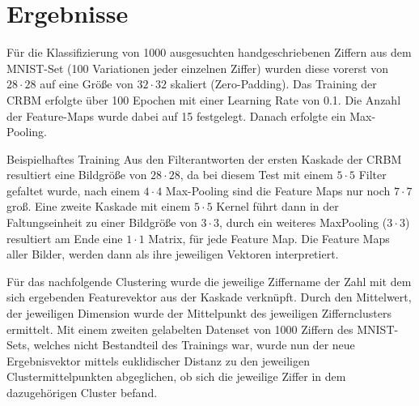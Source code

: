 \section{Ergebnisse}\label{results}

Für die Klassifizierung von 1000 ausgesuchten handgeschriebenen Ziffern aus dem MNIST-Set (100 Variationen jeder einzelnen Ziffer) wurden diese vorerst von $28 \cdot 28$ auf eine Größe von $32 \cdot 32$ skaliert (Zero-Padding). Das Training der CRBM erfolgte über 100 Epochen mit einer Learning Rate von 0.1. Die Anzahl der Feature-Maps wurde dabei auf 15 festgelegt.
Danach erfolgte ein Max-Pooling. 
\newline 

Beispielhaftes Training
Aus den Filterantworten der ersten Kaskade der CRBM resultiert eine Bildgröße von $28 \cdot 28$, da bei diesem Test mit einem $5 \cdot 5$ Filter gefaltet wurde, nach einem $4 \cdot 4$ Max-Pooling sind die Feature Maps nur noch $7 \cdot 7$ groß. Eine zweite Kaskade mit einem  $5 \cdot 5$ Kernel führt dann in der Faltungseinheit zu einer Bildgröße von $3 \cdot 3$, durch ein weiteres MaxPooling ($3 \cdot 3$) resultiert am Ende eine $1 \cdot 1$ Matrix, für jede Feature Map. Die Feature Maps aller Bilder, werden dann als ihre jeweiligen Vektoren interpretiert.

Für das nachfolgende Clustering wurde die jeweilige Ziffername der Zahl mit dem sich ergebenden Featurevektor aus der Kaskade verknüpft. Durch den Mittelwert, der jeweiligen Dimension wurde der Mittelpunkt des jeweiligen Ziffernclusters ermittelt.
Mit einem zweiten gelabelten Datenset von 1000 Ziffern des MNIST-Sets, welches nicht Bestandteil des Trainings war, wurde nun der neue Ergebnisvektor mittels euklidischer Distanz zu den jeweiligen Clustermittelpunkten abgeglichen, ob sich die jeweilige Ziffer in dem dazugehörigen Cluster befand.